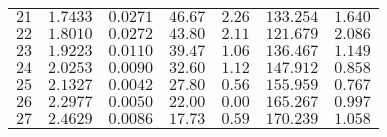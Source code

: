 \documentclass[12pt,a4]{article}
\begin{document}
\begin{table}[h]
\begin{tabular}{c | c | c | c | c | c | c }
$ 21 $&$ 1.7433 $&$ 0.0271 $&$ 46.67 $&$ 2.26 $&$ 133.254 $&$ 1.640 $\\
$ 22 $&$ 1.8010 $&$ 0.0272 $&$ 43.80 $&$ 2.11 $&$ 121.679 $&$ 2.086 $\\
$ 23 $&$ 1.9223 $&$ 0.0110 $&$ 39.47 $&$ 1.06 $&$ 136.467 $&$ 1.149 $\\
$ 24 $&$ 2.0253 $&$ 0.0090 $&$ 32.60 $&$ 1.12 $&$ 147.912 $&$ 0.858 $\\
$ 25 $&$ 2.1327 $&$ 0.0042 $&$ 27.80 $&$ 0.56 $&$ 155.959 $&$ 0.767 $\\
$ 26 $&$ 2.2977 $&$ 0.0050 $&$ 22.00 $&$ 0.00 $&$ 165.267 $&$ 0.997 $\\
$ 27 $&$ 2.4629 $&$ 0.0086 $&$ 17.73 $&$ 0.59 $&$ 170.239 $&$ 1.058 $\\
\end{tabular}
\end{table}
\end{document}
